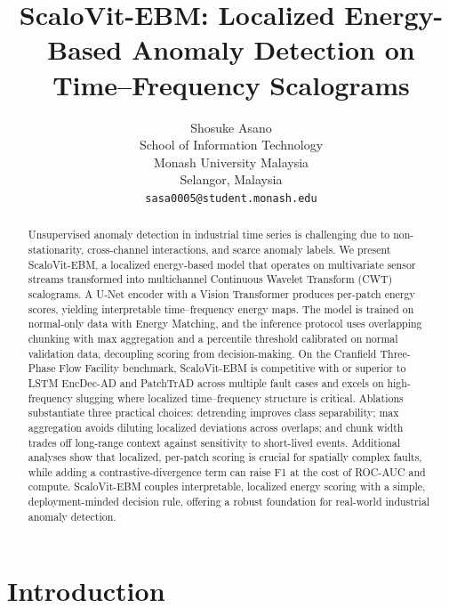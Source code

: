 \documentclass{article}
\title{ScaloVit-EBM: Localized Energy-Based Anomaly Detection on Time–Frequency Scalograms}
\author{%
  Shosuke Asano \\
  School of Information Technology\\
  Monash University Malaysia\\
  Selangor, Malaysia \\
  \texttt{sasa0005@student.monash.edu} \\
}
\begin{document}
\onecolumn

\newpage

\maketitle

\begin{abstract}
Unsupervised anomaly detection in industrial time series is challenging due to non-stationarity, cross-channel interactions, and scarce anomaly labels. We present ScaloVit-EBM, a localized energy-based model that operates on multivariate sensor streams transformed into multichannel Continuous Wavelet Transform (CWT) scalograms. A U-Net encoder with a Vision Transformer produces per-patch energy scores, yielding interpretable time–frequency energy maps. The model is trained on normal-only data with Energy Matching, and the inference protocol uses overlapping chunking with max aggregation and a percentile threshold calibrated on normal validation data, decoupling scoring from decision-making. On the Cranfield Three-Phase Flow Facility benchmark, ScaloVit-EBM is competitive with or superior to LSTM EncDec-AD and PatchTrAD across multiple fault cases and excels on high-frequency slugging where localized time–frequency structure is critical. Ablations substantiate three practical choices: detrending improves class separability; max aggregation avoids diluting localized deviations across overlaps; and chunk width trades off long-range context against sensitivity to short-lived events. Additional analyses show that localized, per-patch scoring is crucial for spatially complex faults, while adding a contrastive-divergence term can raise F1 at the cost of ROC-AUC and compute. ScaloVit-EBM couples interpretable, localized energy scoring with a simple, deployment-minded decision rule, offering a robust foundation for real-world industrial anomaly detection.
\end{abstract}


\section{Introduction}
\end{document}
